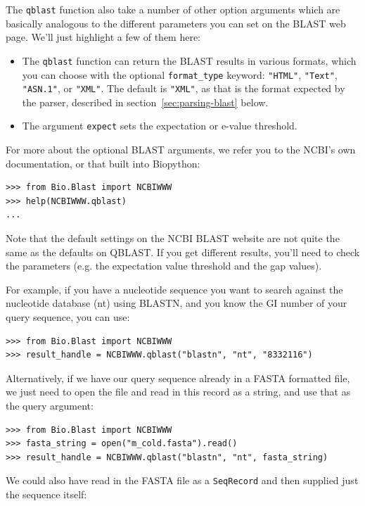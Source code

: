 \documentclass{report}
\begin{document}
The \verb|qblast| function also take a number of other option arguments
which are basically analogous to the different parameters you can set
on the BLAST web page.  We'll just highlight a few of them here:

\begin{itemize}
\item The \verb|qblast| function can return the BLAST results in various
formats, which you can choose with the optional \verb|format_type| keyword:
\verb|"HTML"|, \verb|"Text"|, \verb|"ASN.1"|, or \verb|"XML"|.
The default is \verb|"XML"|, as that is the format expected by the parser,
described in section~\ref{sec:parsing-blast} below.
\item The argument \verb|expect| sets the expectation or e-value threshold.
\end{itemize}

For more about the optional BLAST arguments, we refer you to the NCBI's own
documentation, or that built into Biopython:

\begin{verbatim}
>>> from Bio.Blast import NCBIWWW
>>> help(NCBIWWW.qblast)
...
\end{verbatim}

Note that the default settings on the NCBI BLAST website are not quite
the same as the defaults on QBLAST. If you get different results, you'll
need to check the parameters (e.g. the expectation value threshold and
the gap values).

For example, if you have a nucleotide sequence you want to search against
the nucleotide database (nt) using BLASTN, and you know the GI number of your
query sequence, you can use:

\begin{verbatim}
>>> from Bio.Blast import NCBIWWW
>>> result_handle = NCBIWWW.qblast("blastn", "nt", "8332116")
\end{verbatim}

Alternatively, if we have our query sequence already in a FASTA formatted
file, we just need to open the file and read in this record as a string,
and use that as the query argument:

\begin{verbatim}
>>> from Bio.Blast import NCBIWWW
>>> fasta_string = open("m_cold.fasta").read()
>>> result_handle = NCBIWWW.qblast("blastn", "nt", fasta_string)
\end{verbatim}

We could also have read in the FASTA file as a \verb|SeqRecord| and then
supplied just the sequence itself:
\end{document}
